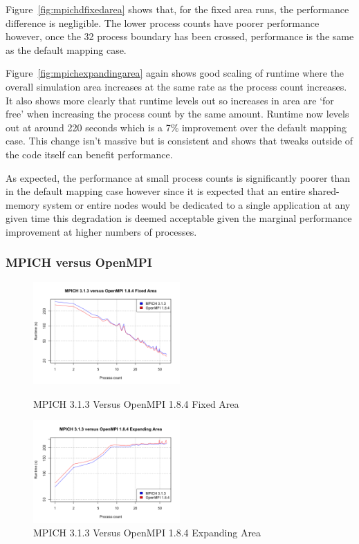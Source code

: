 Figure~\ref{fig:mpichdfixedarea} shows that, for the fixed area runs, the
performance difference is negligible. The lower process counts have poorer
performance however, once the 32 process boundary has been crossed, performance
is the same as the default mapping case.

Figure~\ref{fig:mpichexpandingarea} again shows good scaling of
runtime where the overall simulation area increases at the same rate as the
process count increases. It also shows more clearly that runtime levels out so
increases in area are `for free' when increasing the process count by the same
amount. Runtime now levels out at around 220 seconds which is a 7\% improvement
over the default mapping case. This change isn't massive but is consistent and
shows that tweaks outside of the code itself can benefit performance.

As expected, the performance at small process counts is significantly poorer
than in the default mapping case however since it is expected that an entire
shared-memory system or entire nodes would be dedicated to a single application
at any given time this degradation is deemed acceptable given the marginal
performance improvement at higher numbers of processes.

\subsubsection{MPICH versus OpenMPI}

\begin{figure}
    \includegraphics[width=0.5\textwidth]
    {graphs/MPICH313-OpenMPI184-fixed-area.png}
    \caption{MPICH 3.1.3 Versus OpenMPI 1.8.4 Fixed Area}
    \label{fig:mpichversusopenmpifixedarea}
    \includegraphics[width=0.5\textwidth]
    {graphs/MPICH313-OpenMPI184-expanding-area.png}
    \caption{MPICH 3.1.3 Versus OpenMPI 1.8.4 Expanding Area}
    \label{fig:mpichversusopenmpiexpandingarea}
\end{figure}

